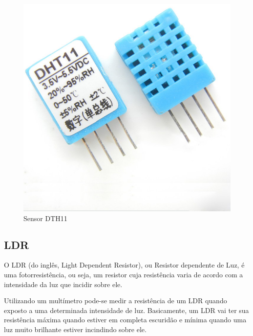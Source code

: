 \begin{figure}[ht]
      \centering
      \includegraphics[scale=0.20]{figuras/FDHT11.jpg}
      \caption{Sensor DTH11}
      \label{fig:Sdth11}
\end{figure}

\subsection{LDR}

O LDR (do inglês, Light Dependent Resistor), ou Resistor dependente de Luz, é uma fotorresistência, ou seja, um resistor cuja resistência varia de acordo com a intensidade da luz que incidir sobre ele. 

Utilizando um multímetro pode-se medir a resistência de um LDR quando exposto a uma determinada intensidade de luz. Basicamente, um LDR vai ter sua resistência máxima quando estiver em completa escuridão e mínima quando uma luz muito brilhante estiver incindindo sobre ele.

